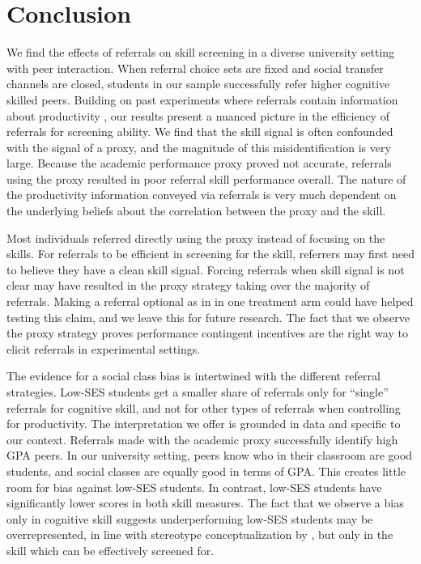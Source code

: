 \documentclass[11pt,a4paper,oneside]{article}
\begin{document}
  \section{Conclusion} \label{s6}
  We find the effects of referrals on skill screening in a diverse university setting with peer interaction. When referral choice sets are fixed and social transfer channels are closed, students in our sample successfully refer higher cognitive skilled peers. Building on past experiments where referrals contain information about productivity \citep{beaman_who_2012,beaman_job_2018,pallais_why_2016}, our results present a nuanced picture in the efficiency of referrals for screening ability. We find that the skill signal is often confounded with the signal of a proxy, and the magnitude of this misidentification is very large. Because the academic performance proxy proved not accurate, referrals using the proxy resulted in poor referral skill performance overall. The nature of the productivity information conveyed via referrals is very much dependent on the underlying beliefs about the correlation between the proxy and the skill.

  Most individuals referred directly using the proxy instead of focusing on the skills. For referrals to be efficient in screening for the skill, referrers may first need to believe they have a clean skill signal. Forcing referrals when skill signal is not clear may have resulted in the proxy strategy taking over the majority of referrals. Making a referral optional as in \citet{beaman_who_2012,beaman_job_2018} in one treatment arm could have helped testing this claim, and we leave this for future research. The fact that we observe the proxy strategy proves performance contingent incentives are the right way to elicit referrals in experimental settings.
  
  The evidence for a social class bias is intertwined with the different referral strategies. Low-SES students get a smaller share of referrals only for ``single'' referrals for cognitive skill, and not for other types of referrals when controlling for productivity. The interpretation we offer is grounded in data and specific to our context. Referrals made with the academic proxy successfully identify high GPA peers. In our university setting, peers know who in their classroom are good students, and social classes are equally good in terms of GPA. This creates little room for bias against low-SES students. In contrast, low-SES students have significantly lower scores in both skill measures. The fact that we observe a bias only in cognitive skill suggests underperforming low-SES students may be overrepresented, in line with stereotype conceptualization by \citet{bordalo2016stereotypes}, but only in the skill which can be effectively screened for.
  
\end{document}
